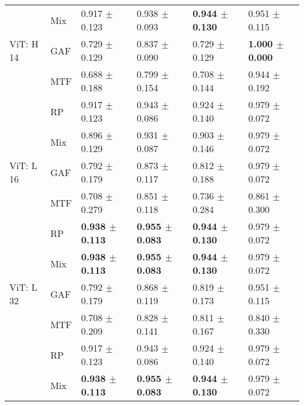 \begin{longtable}[t]{llllll}
 & Mix & 0.917 $\pm$ 0.123 & 0.938 $\pm$ 0.093 & \textbf{0.944 $\pm$ 0.130} & 0.951 $\pm$ 0.115 \\
ViT: H 14 & GAF & 0.729 $\pm$ 0.129 & 0.837 $\pm$ 0.090 & 0.729 $\pm$ 0.129 & \textbf{1.000 $\pm$ 0.000} \\
 & MTF & 0.688 $\pm$ 0.188 & 0.799 $\pm$ 0.154 & 0.708 $\pm$ 0.144 & 0.944 $\pm$ 0.192 \\
 & RP & 0.917 $\pm$ 0.123 & 0.943 $\pm$ 0.086 & 0.924 $\pm$ 0.140 & 0.979 $\pm$ 0.072 \\
 & Mix & 0.896 $\pm$ 0.129 & 0.931 $\pm$ 0.087 & 0.903 $\pm$ 0.146 & 0.979 $\pm$ 0.072 \\
ViT: L 16 & GAF & 0.792 $\pm$ 0.179 & 0.873 $\pm$ 0.117 & 0.812 $\pm$ 0.188 & 0.979 $\pm$ 0.072 \\
 & MTF & 0.708 $\pm$ 0.279 & 0.851 $\pm$ 0.118 & 0.736 $\pm$ 0.284 & 0.861 $\pm$ 0.300 \\
 & RP & \textbf{0.938 $\pm$ 0.113} & \textbf{0.955 $\pm$ 0.083} & \textbf{0.944 $\pm$ 0.130} & 0.979 $\pm$ 0.072 \\
 & Mix & \textbf{0.938 $\pm$ 0.113} & \textbf{0.955 $\pm$ 0.083} & \textbf{0.944 $\pm$ 0.130} & 0.979 $\pm$ 0.072 \\
ViT: L 32 & GAF & 0.792 $\pm$ 0.179 & 0.868 $\pm$ 0.119 & 0.819 $\pm$ 0.173 & 0.951 $\pm$ 0.115 \\
 & MTF & 0.708 $\pm$ 0.209 & 0.828 $\pm$ 0.141 & 0.811 $\pm$ 0.167 & 0.840 $\pm$ 0.330 \\
 & RP & 0.917 $\pm$ 0.123 & 0.943 $\pm$ 0.086 & 0.924 $\pm$ 0.140 & 0.979 $\pm$ 0.072 \\
 & Mix & \textbf{0.938 $\pm$ 0.113} & \textbf{0.955 $\pm$ 0.083} & \textbf{0.944 $\pm$ 0.130} & 0.979 $\pm$ 0.072 \\
\end{longtable}
